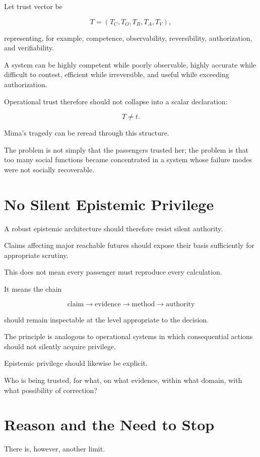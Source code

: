 \documentclass[11pt,oneside]{book}
\theoremstyle{definition}
\theoremstyle{remark}
\begin{document}
Let trust vector be

\[
T
=
(
T_C,
T_O,
T_R,
T_A,
T_V
),
\]

representing, for example, competence, observability, reversibility, authorization, and verifiability.

A system can be highly competent while poorly observable, highly accurate while difficult to contest, efficient while irreversible, and useful while exceeding authorization.

Operational trust therefore should not collapse into a scalar declaration:

\[
T\neq t.
\]

Mima's tragedy can be reread through this structure.

The problem is not simply that the passengers trusted her; the problem is that too many social functions became concentrated in a system whose failure modes were not socially recoverable.

\section{No Silent Epistemic Privilege}

A robust epistemic architecture should therefore resist silent authority.

Claims affecting major reachable futures should expose their basis sufficiently for appropriate scrutiny.

This does not mean every passenger must reproduce every calculation.

It means the chain

\[
\text{claim}
\rightarrow
\text{evidence}
\rightarrow
\text{method}
\rightarrow
\text{authority}
\]

should remain inspectable at the level appropriate to the decision.

The principle is analogous to operational systems in which consequential actions should not silently acquire privilege.

Epistemic privilege should likewise be explicit.

Who is being trusted, for what, on what evidence, within what domain, with what possibility of correction?

\section{Reason and the Need to Stop}

There is, however, another limit.
\end{document}
